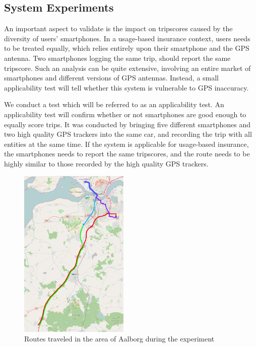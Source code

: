 \subsection{System Experiments}\label{subsec:expsystem}
An important aspect to validate is the impact on tripscores caused by the diversity of users' smartphones. In a usage-based insurance context, users needs to be treated equally, which relies entirely upon their smartphone and the GPS antenna. Two smartphones logging the same trip, should report the same tripscore. Such an analysis can be quite extensive, involving an entire market of smartphones and different versions of GPS antennas. Instead, a small applicability test will tell whether this system is vulnerable to GPS inaccuracy. 

We conduct a test which will be referred to as an applicability test. An applicability test will confirm whether or not smartphones are good enough to equally score trips. It was conducted by bringing five different smartphones and two high quality GPS trackers\citep{quality_gps_device} into the same car, and recording the trip with all entities at the same time. If the system is applicable for usage-based insurance, the smartphones needs to report the same tripscores, and the route needs to be highly similar to those recorded by the high quality GPS trackers.
 
\begin{figure}[tb]
\centering
\includegraphics[width=0.465\textwidth]{Pictures/experiment_routes}
\caption{Routes traveled in the area of Aalborg during the experiment}
\label{fig:experiment_routes}
\end{figure}

